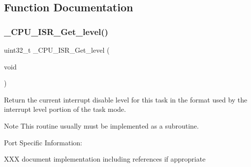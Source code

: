 \subsection{Function Documentation}
\mbox{\label{group__RTEMSScoreCPUBfinCPUInterrupt_ga1d9dcab9170d532b6634a5620385adbd}} 
\subsubsection{\texorpdfstring{\_CPU\_ISR\_Get\_level()}{\_CPU\_ISR\_Get\_level()}}
{\footnotesize\ttfamily uint32\+\_\+t \+\_\+\+C\+P\+U\+\_\+\+I\+S\+R\+\_\+\+Get\+\_\+level (\begin{DoxyParamCaption}\item[{void}]{ }\end{DoxyParamCaption})}

Return the current interrupt disable level for this task in the format used by the interrupt level portion of the task mode.

\begin{DoxyNote}{Note}
This routine usually must be implemented as a subroutine.
\end{DoxyNote}
Port Specific Information\+:

X\+XX document implementation including references if appropriate 